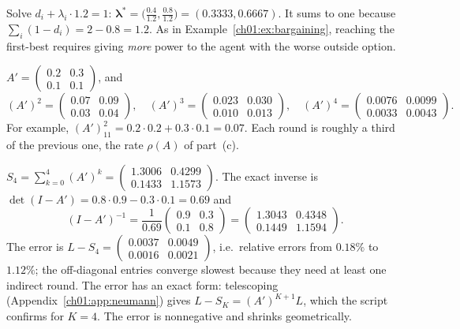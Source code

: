 \documentclass[../solutions_manual.tex]{subfiles}
\begin{document}
 Solve $d_i + \lambda_i \cdot 1.2 = 1$: $\boldsymbol\lambda^* = \bigl(\frac{0.4}{1.2}, \frac{0.8}{1.2}\bigr) = (0.3333, 0.6667)$. It sums to one because $\sum_i(1 - d_i) = 2 - 0.8 = 1.2$. As in Example~\ref{ch01:ex:bargaining}, reaching the first-best requires giving \emph{more} power to the agent with the worse outside option.


 $A' = \begin{pmatrix} 0.2 & 0.3 \\ 0.1 & 0.1\end{pmatrix}$, and
\[
(A')^2 = \begin{pmatrix} 0.07 & 0.09 \\ 0.03 & 0.04 \end{pmatrix},\quad
(A')^3 = \begin{pmatrix} 0.023 & 0.030 \\ 0.010 & 0.013 \end{pmatrix},\quad
(A')^4 = \begin{pmatrix} 0.0076 & 0.0099 \\ 0.0033 & 0.0043 \end{pmatrix}.
\]
For example, $(A')^2_{11} = 0.2\cdot0.2 + 0.3\cdot0.1 = 0.07$. Each round is roughly a third of the previous one, the rate $\rho(A)$ of part~(c).

 $S_4 = \sum_{k=0}^4(A')^k = \begin{pmatrix} 1.3006 & 0.4299 \\ 0.1433 & 1.1573\end{pmatrix}$. The exact inverse is $\det(I - A') = 0.8\cdot0.9 - 0.3\cdot0.1 = 0.69$ and
\[
(I - A')^{-1} = \frac{1}{0.69}\begin{pmatrix} 0.9 & 0.3 \\ 0.1 & 0.8\end{pmatrix} = \begin{pmatrix} 1.3043 & 0.4348 \\ 0.1449 & 1.1594\end{pmatrix}.
\]
The error is $L - S_4 = \begin{pmatrix} 0.0037 & 0.0049 \\ 0.0016 & 0.0021\end{pmatrix}$, i.e.\ relative errors from $0.18\%$ to $1.12\%$; the off-diagonal entries converge slowest because they need at least one indirect round. The error has an exact form: telescoping (Appendix~\ref{ch01:app:neumann}) gives $L - S_K = (A')^{K+1}L$, which the script confirms for $K = 4$. The error is nonnegative and shrinks geometrically.
\end{document}
